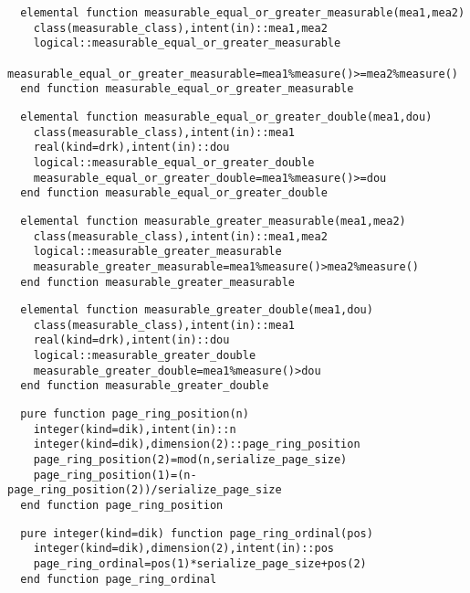 \begin{Verbatim}
  elemental function measurable_equal_or_greater_measurable(mea1,mea2)
    class(measurable_class),intent(in)::mea1,mea2
    logical::measurable_equal_or_greater_measurable
    measurable_equal_or_greater_measurable=mea1%measure()>=mea2%measure()
  end function measurable_equal_or_greater_measurable
\end{Verbatim}

\begin{Verbatim}
  elemental function measurable_equal_or_greater_double(mea1,dou)
    class(measurable_class),intent(in)::mea1
    real(kind=drk),intent(in)::dou
    logical::measurable_equal_or_greater_double
    measurable_equal_or_greater_double=mea1%measure()>=dou
  end function measurable_equal_or_greater_double
\end{Verbatim}
  
\begin{Verbatim}
  elemental function measurable_greater_measurable(mea1,mea2)
    class(measurable_class),intent(in)::mea1,mea2
    logical::measurable_greater_measurable
    measurable_greater_measurable=mea1%measure()>mea2%measure()
  end function measurable_greater_measurable
\end{Verbatim}

\begin{Verbatim}
  elemental function measurable_greater_double(mea1,dou)
    class(measurable_class),intent(in)::mea1
    real(kind=drk),intent(in)::dou
    logical::measurable_greater_double
    measurable_greater_double=mea1%measure()>dou
  end function measurable_greater_double
\end{Verbatim}

\begin{Verbatim}
  pure function page_ring_position(n)
    integer(kind=dik),intent(in)::n
    integer(kind=dik),dimension(2)::page_ring_position
    page_ring_position(2)=mod(n,serialize_page_size)
    page_ring_position(1)=(n-page_ring_position(2))/serialize_page_size
  end function page_ring_position
\end{Verbatim}

\begin{Verbatim}
  pure integer(kind=dik) function page_ring_ordinal(pos)
    integer(kind=dik),dimension(2),intent(in)::pos
    page_ring_ordinal=pos(1)*serialize_page_size+pos(2)
  end function page_ring_ordinal
\end{Verbatim}

